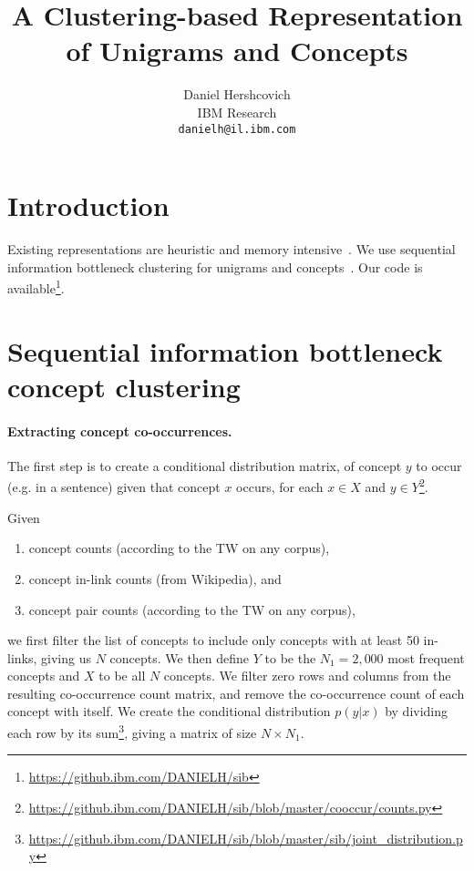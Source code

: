 \documentclass{article}
\title{A Clustering-based Representation \\ of Unigrams and Concepts}
\author{
Daniel Hershcovich \\
IBM Research\\
\texttt{danielh@il.ibm.com} \\
}
\begin{document}
    \maketitle

    \begin{abstract}
    \end{abstract}

    \section{Introduction}\label{sec:introduction}

    Existing representations are heuristic and memory intensive~\cite{mikolov2013efficient,pennington2014glove}.
    We use sequential information bottleneck clustering for unigrams and concepts~\cite{slonim2000document}.
    Our code is available\footnote{\url{https://github.ibm.com/DANIELH/sib}}.

    \section{Sequential information bottleneck concept clustering}\label{sec:clustering}

    \paragraph{Extracting concept co-occurrences.}

    The first step is to create a conditional distribution matrix,
    of concept $y$ to occur (e.g. in a sentence) given that concept $x$ occurs, for each
    $x\in X$ and
    $y\in Y$\footnote{\url{https://github.ibm.com/DANIELH/sib/blob/master/cooccur/counts.py}}.

    Given
    \begin{enumerate}
        \item concept counts (according to the TW on any corpus),
        \item concept in-link counts (from Wikipedia), and
        \item concept pair counts (according to the TW on any corpus),
    \end{enumerate}
    we first filter the list of concepts to include only concepts with at least 50
    in-links,
    giving us $N$ concepts.
    We then define $Y$ to be the $N_1=2,000$ most frequent concepts
    and $X$ to be all $N$ concepts.
    We filter zero rows and columns from the resulting co-occurrence count matrix,
    and remove the co-occurrence count of each concept with itself.
    We create the conditional distribution $p(y|x)$ by dividing each row by its
    sum\footnote{\url{https://github.ibm.com/DANIELH/sib/blob/master/sib/joint_distribution.py}},
    giving a matrix of size $N\times N_1$.
\end{document}
